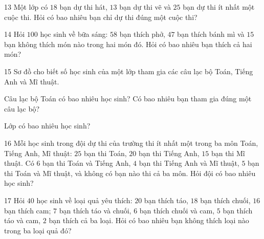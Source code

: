 \gap
\begin{probbox}{13}{\relax}
Một lớp có $18$ bạn dự thi hát, $13$ bạn dự thi vẽ và $25$ bạn dự thi ít nhất một cuộc thi. Hỏi có bao nhiêu bạn chỉ dự thi đúng một cuộc thi?
\end{probbox}
\gap
\begin{probbox}{14}{\relax}
Hỏi $100$ học sinh về bữa sáng: $58$ bạn thích phở, $47$ bạn thích bánh mì và $15$ bạn không thích món nào trong hai món đó. Hỏi có bao nhiêu bạn thích cả hai món?
\end{probbox}
\gap
\needspace{7.5cm}
\begin{probbox}{15}{\relax}
Sơ đồ cho biết số học sinh của một lớp tham gia các câu lạc bộ Toán, Tiếng Anh và Mĩ thuật.
\begin{center}
\end{center}
 Câu lạc bộ Toán có bao nhiêu học sinh? \quad {} Có bao nhiêu bạn tham gia đúng một câu lạc bộ?\par
{} Lớp có bao nhiêu học sinh?
\end{probbox}
\gap
\begin{probbox}{16}{\relax}
Mỗi học sinh trong đội dự thi của trường thi ít nhất một trong ba môn Toán, Tiếng Anh, Mĩ thuật: $25$ bạn thi Toán, $20$ bạn thi Tiếng Anh, $15$ bạn thi Mĩ thuật. Có $6$ bạn thi Toán và Tiếng Anh, $4$ bạn thi Tiếng Anh và Mĩ thuật, $5$ bạn thi Toán và Mĩ thuật, và không có bạn nào thi cả ba môn. Hỏi đội có bao nhiêu học sinh?
\end{probbox}
\gap
\begin{probbox}{17}{\relax}
Hỏi $40$ học sinh về loại quả yêu thích: $20$ bạn thích táo, $18$ bạn thích chuối, $16$ bạn thích cam; $7$ bạn thích táo và chuối, $6$ bạn thích chuối và cam, $5$ bạn thích táo và cam, $2$ bạn thích cả ba loại. Hỏi có bao nhiêu bạn không thích loại nào trong ba loại quả đó?
\end{probbox}
